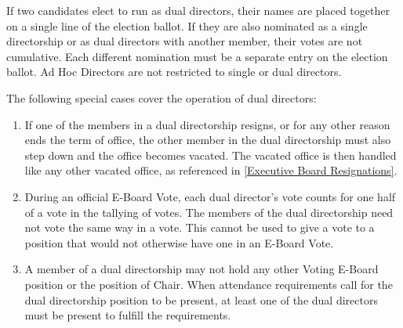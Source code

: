 \documentclass{article}
\begin{document}
If two candidates elect to run as dual directors, their names are placed together on a single line of the election ballot.
If they are also nominated as a single directorship or as dual directors with another member, their votes are not cumulative.
Each different nomination must be a separate entry on the election ballot.
Ad Hoc Directors are not restricted to single or dual directors.

The following special cases cover the operation of dual directors:
\begin{enumerate}
	\item If one of the members in a dual directorship resigns, or for any other reason ends the term of office, the other member in the dual directorship must also step down and the office becomes vacated.
	      The vacated office is then handled like any other vacated office, as referenced in \ref{Executive Board Resignations}.
	\item During an official E-Board Vote, each dual director's vote counts for one half of a vote in the tallying of votes.
	      The members of the dual directorship need not vote the same way in a vote.
	      This cannot be used to give a vote to a position that would not otherwise have one in an E-Board Vote.
	\item A member of a dual directorship may not hold any other Voting E-Board position or the position of Chair.
	      When attendance requirements call for the dual directorship position to be present, at least one of the dual directors must be present to fulfill the requirements.
\end{enumerate}
\end{document}

